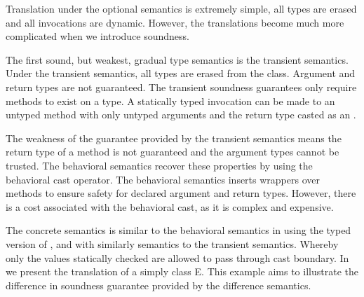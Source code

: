 \documentclass[runnningheads]{tex/llncs}
\begin{document}
Translation under the optional semantics is extremely simple, all types are
erased and all invocations are dynamic. However, the translations become 
much more complicated when we introduce soundness.

The first sound, but weakest, gradual type semantics is the transient
semantics. Under the transient semantics, all types are erased from the class.
Argument and return types are not guaranteed. The transient soundness guarantees
only require methods to exist on a type. A statically typed invocation 
can be made to an untyped method \m with only untyped arguments 
and the return type casted as an \any.

The weakness of the guarantee provided by the transient semantics means  
the return type of a method is not guaranteed and the argument
types cannot be trusted. The behavioral semantics recover these properties by using
the behavioral cast operator. The behavioral semantics inserts wrappers over
methods to ensure safety for declared argument and return types. 
However, there is a cost associated with the behavioral
cast, as it is complex and expensive.

The concrete semantics is similar to the behavioral semantics in using the 
typed version of \m, and with similarly semantics to the transient
semantics. Whereby only the values statically checked are
allowed to pass through cast boundary. 
In  we present the translation of a simply
class {\xt E}. This example aims to illustrate the difference in
soundness guarantee provided by the difference semantics.
\end{document}
